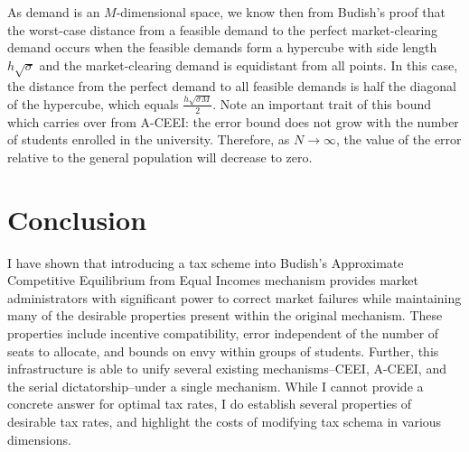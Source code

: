 \documentclass{article}
\begin{document}
As demand is an $M$-dimensional space, we know then from Budish's proof that the worst-case distance from a feasible demand to the perfect market-clearing demand occurs when the feasible demands form a hypercube with side length $h\sqrt{\sigma}$ and the market-clearing demand is equidistant from all points. In this case, the distance from the perfect demand to all feasible demands is half the diagonal of the hypercube, which equals $\frac{h\sqrt{\sigma M}}{2}$. Note an important trait of this bound which carries over from A-CEEI: the error bound does not grow with the number of students enrolled in the university. Therefore, as $N \rightarrow \infty$, the value of the error relative to the general population will decrease to zero. 

\section{Conclusion}

I have shown that introducing a tax scheme into Budish's Approximate Competitive Equilibrium from Equal Incomes mechanism provides market administrators with significant power to correct market failures while maintaining many of the desirable properties present within the original mechanism. These properties include incentive compatibility, error independent of the number of seats to allocate, and bounds on envy within groups of students. Further, this infrastructure is able to unify several existing mechanisms--CEEI, A-CEEI, and the serial dictatorship--under a single mechanism. While I cannot provide a concrete answer for optimal tax rates, I do establish several properties of desirable tax rates, and highlight the costs of modifying tax schema in various dimensions. 



\printbibliography
\end{document}
